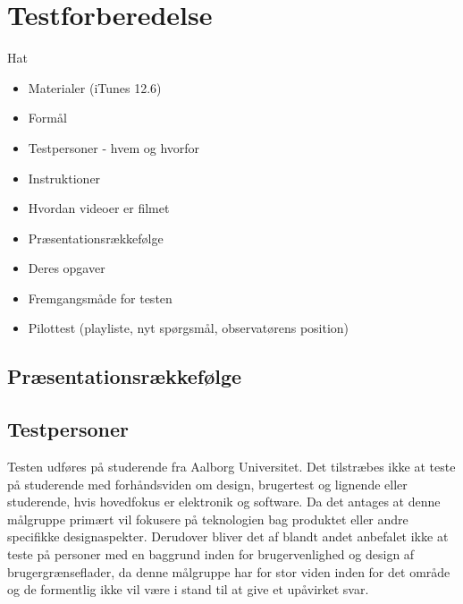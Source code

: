 \section{Testforberedelse}
\label{Testforberedelse}
%
Hat
%
\begin{itemize}
  \item Materialer (iTunes 12.6)
  \item Formål
  \item Testpersoner - hvem og hvorfor
  \item Instruktioner
  \item Hvordan videoer er filmet
  \item Præsentationsrækkefølge 
  \item Deres opgaver
  \item Fremgangsmåde for testen 
  \item Pilottest (playliste, nyt spørgsmål, observatørens position)
\end{itemize}
%
\subsection{Præsentationsrækkefølge}
\label{PraesentationsraekkefoelgeValgAfGestikker}
%

\subsection{Testpersoner}
\label{TestpersonerValgAfGestikker}
%
Testen udføres på studerende fra Aalborg Universitet. Det tilstræbes ikke at teste på studerende med forhåndsviden om design, brugertest og lignende eller studerende, hvis hovedfokus er elektronik og software. Da det antages at denne målgruppe primært vil fokusere på teknologien bag produktet eller andre specifikke designaspekter. Derudover bliver det af \textcite[s. 110]{Book:OUE} blandt andet anbefalet ikke at teste på personer med en baggrund inden for brugervenlighed og design af brugergrænseflader, da denne målgruppe har for stor viden inden for det område og de formentlig ikke vil være i stand til at give et upåvirket svar.

